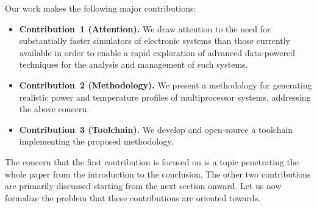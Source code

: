 Our work makes the following major contributions:

\begin{itemize}
  \item {\bfseries Contribution~1 (Attention).} We draw attention to the need
  for substantially faster simulators of electronic systems than those currently
  available in order to enable a rapid exploration of advanced data-powered
  techniques for the analysis and management of such systems.

  \item {\bfseries Contribution~2 (Methodology).} We present a methodology for
  generating realistic power and temperature profiles of multiprocessor systems,
  addressing the above concern.

  \item {\bfseries Contribution~3 (Toolchain).} We develop and open-source a
  toolchain implementing the proposed methodology.
\end{itemize}

The concern that the first contribution is focused on is a topic penetrating the
whole paper from the introduction to the conclusion. The other two contributions
are primarily discussed starting from the next section onward. Let us now
formalize the problem that these contributions are oriented towards.
